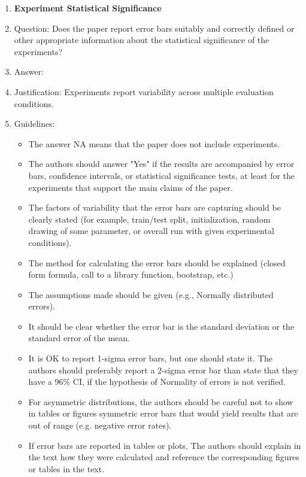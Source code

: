 \documentclass{article}
\theoremstyle{plain}
\theoremstyle{definition}
\begin{document}
\begin{enumerate}
  \item {\bf Experiment Statistical Significance}
  \item[] Question: Does the paper report error bars suitably and correctly defined or other appropriate information about the statistical significance of the experiments?
  \item[] Answer: \answerYes{}
  \item[] Justification: Experiments report variability across multiple evaluation conditions.
  \item[] Guidelines:
    \begin{itemize}
      \item The answer NA means that the paper does not include experiments.
      \item The authors should answer "Yes" if the results are accompanied by error bars, confidence intervals, or statistical significance tests, at least for the experiments that support the main claims of the paper.
      \item The factors of variability that the error bars are capturing should be clearly stated (for example, train/test split, initialization, random drawing of some parameter, or overall run with given experimental conditions).
      \item The method for calculating the error bars should be explained (closed form formula, call to a library function, bootstrap, etc.)
      \item The assumptions made should be given (e.g., Normally distributed errors).
      \item It should be clear whether the error bar is the standard deviation or the standard error of the mean.
      \item It is OK to report 1-sigma error bars, but one should state it. The authors should preferably report a 2-sigma error bar than state that they have a 96\% CI, if the hypothesis of Normality of errors is not verified.
      \item For asymmetric distributions, the authors should be careful not to show in tables or figures symmetric error bars that would yield results that are out of range (e.g. negative error rates).
      \item If error bars are reported in tables or plots, The authors should explain in the text how they were calculated and reference the corresponding figures or tables in the text.
    \end{itemize}


\end{enumerate}
\end{document}
